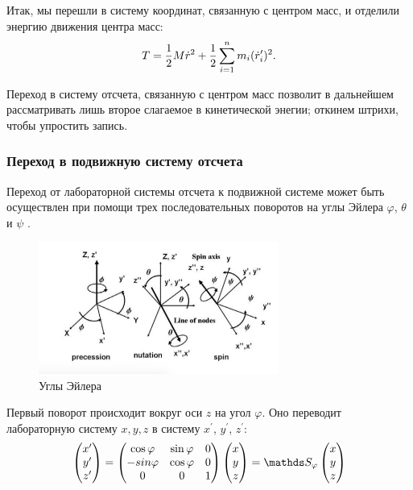 Итак, мы перешли в систему координат, связанную с центром масс, и отделили энергию движения центра масс:
\vspace*{-0.1cm}
\begin{gather}
T = \frac{1}{2} M \dot{r}^2 + \frac{1}{2} \sum_{i=1}^{n} m_i( \dot{r}_i^\prime)^2. \notag
\end{gather}

Переход в систему отсчета, связанную с центром масс позволит в дальнейшем рассматривать лишь второе слагаемое в кинетической энегии; откинем штрихи, чтобы упростить запись.

\subsubsection{Переход в подвижную систему отсчета}

\hspace{0.48cm} Переход от лабораторной системы отсчета к подвижной системе может быть осуществлен при помощи трех последовательных поворотов на углы Эйлера $\varphi$, $\theta$ и $\psi$ \cite{goldstein, landau}. 

\begin{figure}
  \centering
	\includegraphics[width=0.7\textwidth]{../pictures/EulerAngles.jpg}
	\caption{Углы Эйлера}
	\label{fig:EulerAngles}
\end{figure}

Первый поворот происходит вокруг оси $z$ на угол $\varphi$. Оно переводит лабораторную систему $x, y, z$ в систему $x^\prime$, $y^\prime$, $z^\prime$: 
\begin{gather}
\begin{pmatrix}
x^\prime \\
y^\prime \\
z^\prime
\end{pmatrix} = 
\begin{pmatrix}
\cos \varphi & \sin \varphi & 0 \\
- sin \varphi & \cos \varphi & 0 \\
0 & 0 & 1
\end{pmatrix}
\begin{pmatrix}
x \\
y \\
z
\end{pmatrix} =
\bbS_\varphi
\begin{pmatrix}
x \\
y \\
z
\end{pmatrix} \notag
\end{gather}

